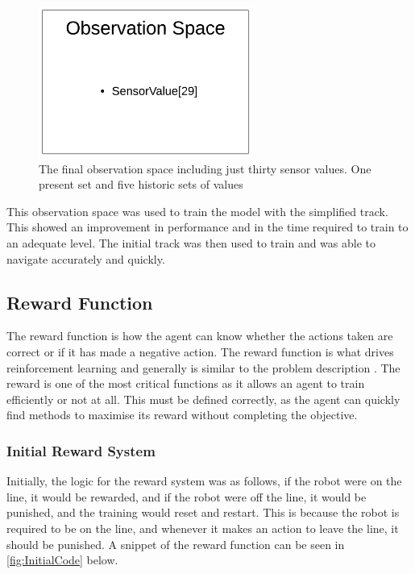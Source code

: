 \documentclass[a4paper,12pt]{article}
\begin{document}
\begin{figure}[H]
\centering
\includegraphics[width=7cm]{imgs/FinalObsSpace.png}
\caption{The final observation space including just thirty sensor values. One present set and five historic sets of values}
\label{fig:FinalObsSpace}
\end{figure}
\noindent 
This observation space was used to train the model with the simplified track. This showed an improvement in performance and in the time required to train to an adequate level. The initial track was then used to train and was able to navigate accurately and quickly.
 


\subsection{Reward Function}

The reward function is how the agent can know whether the actions taken are correct or if it has made a negative action. The reward function is what drives reinforcement learning and generally is similar to the problem description \cite{niekum2011evolution}. The reward is one of the most critical functions as it allows an agent to train efficiently or not at all. This must be defined correctly, as the agent can quickly find methods to maximise its reward without completing the objective.

\subsubsection{Initial Reward System}

Initially, the logic for the reward system was as follows, if the robot were on the line, it would be rewarded, and if the robot were off the line, it would be punished, and the training would reset and restart. This is because the robot is required to be on the line, and whenever it makes an action to leave the line, it should be punished. A snippet of the reward function can be seen in \autoref{fig:InitialCode} below.
\\\\
\end{document}

